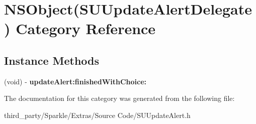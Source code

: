 \hypertarget{category_n_s_object_07_s_u_update_alert_delegate_08}{}\section{N\+S\+Object(S\+U\+Update\+Alert\+Delegate) Category Reference}
\label{category_n_s_object_07_s_u_update_alert_delegate_08}
\subsection*{Instance Methods}
\begin{DoxyCompactItemize}
\item 
\mbox{\label{category_n_s_object_07_s_u_update_alert_delegate_08_a721c2ad71ce8156fab0b3b96d5065f5e}} 
(void) -\/ {\bfseries update\+Alert\+:finished\+With\+Choice\+:}
\end{DoxyCompactItemize}


The documentation for this category was generated from the following file\+:\begin{DoxyCompactItemize}
\item 
third\+\_\+party/\+Sparkle/\+Extras/\+Source Code/S\+U\+Update\+Alert.\+h\end{DoxyCompactItemize}
